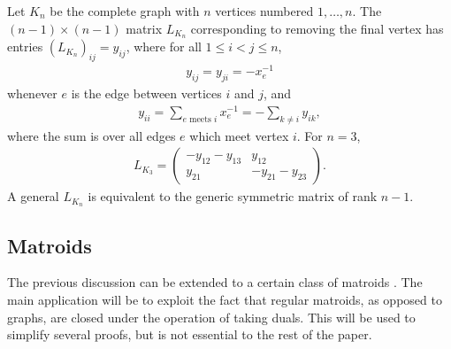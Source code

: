 \documentclass[pdftex]{sigma}%
\numberwithin{equation}{section}
\newcommand{\0}{\color{blue}{\mathsf{0}}}
\begin{document}
\begin{Example} \label{Example: Kn}
Let $K_n$ be the complete graph with $n$ vertices numbered $1,\dots, n$.
The $(n-1)\times (n-1)$ matrix $L_{K_n} $ corresponding to removing the final vertex has entries $\left(L_{K_n} \right)_{ij} =y_{ij}$, where for
 all $1\leq i < j \leq n$,
\begin{gather*}
y_{ij} =y_{ji}= -x_e^{-1}
\end{gather*}
whenever $e$ is the edge between vertices $i$ and $j$, and
\begin{gather*}
y_{ii} = \sum_{e {\text{ meets }} i} x_e^{-1} = - \sum_{k\neq i } y_{ik},
\end{gather*}
where the sum is over all edges $e$ which meet vertex $i$.
For $n=3$,
\begin{gather*}
L_{K_3} = \begin{pmatrix}
 -y_{12}-y_{13} & y_{12} \\
y_{21} & -y_{21}-y_{23}
 \end{pmatrix}\!.
 \end{gather*}
A general $L_{K_n}$ is equivalent to the generic symmetric matrix of rank $n-1$.
\end{Example}



 \subsection{Matroids} \label{sect: Matroids} The previous discussion can be extended to a certain class of matroids \cite{Matroids}. The main application will be to exploit the fact that regular matroids, as opposed to graphs, are closed under the operation of taking duals. This will be used to simplify several proofs, but is not essential to the rest of the paper.
\end{document}
